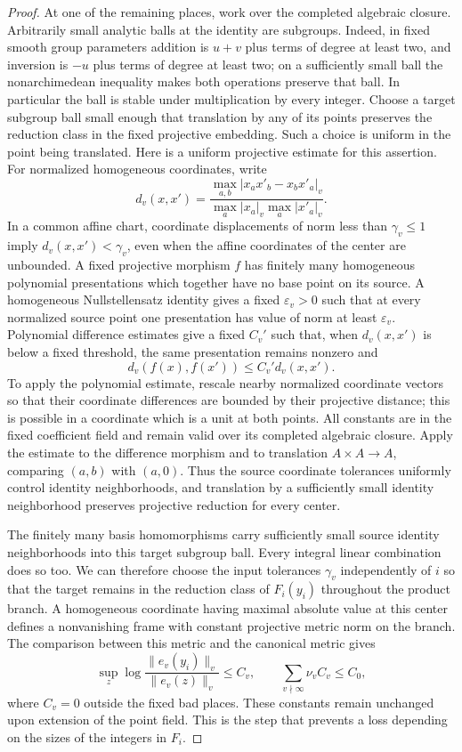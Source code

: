 \begin{proof}
At one of the remaining places, work over the completed algebraic
closure.  Arbitrarily small analytic balls at the identity are
subgroups.  Indeed, in fixed smooth group parameters addition is
$u+v$ plus terms of degree at least two, and inversion is $-u$ plus
terms of degree at least two; on a sufficiently small ball the
nonarchimedean inequality makes both operations preserve that ball.
In particular the ball is stable under multiplication by every
integer.  Choose a target subgroup ball small enough that translation
by any of its points preserves the reduction class in the fixed
projective embedding.  Such a choice is uniform in the point being
translated.  Here is a uniform projective estimate for this assertion. For normalized
homogeneous coordinates, write
\[
 d_v(x,x')=\frac{\max_{a,b}|x_ax'_b-x_bx'_a|_v}
                  {\max_a|x_a|_v\max_a|x'_a|_v}.
\]
In a common affine chart, coordinate displacements of norm less than
$\gamma_v\le1$ imply $d_v(x,x')<\gamma_v$, even when the affine
coordinates of the center are unbounded. A fixed projective morphism $f$
has finitely many homogeneous polynomial presentations which together
have no base point on its source. A homogeneous Nullstellensatz
identity gives a fixed $\varepsilon_v>0$ such that at every normalized
source point one presentation has value of norm at least $\varepsilon_v$. Polynomial
difference estimates give a fixed $C_v'$ such that, when
$d_v(x,x')$ is below a fixed threshold, the same presentation remains
nonzero and
\[
 d_v(f(x),f(x'))\le C_v' d_v(x,x').
\]
To apply the polynomial estimate, rescale nearby normalized coordinate
vectors so that their coordinate differences are bounded by their
projective distance; this is possible in a coordinate which is a unit
at both points. All constants are in the fixed coefficient field and
remain valid over its completed algebraic closure.
Apply the estimate to the difference morphism and to translation
$A\times A\to A$, comparing $(a,b)$ with $(a,0)$. Thus the source
coordinate tolerances uniformly control identity neighborhoods, and
translation by a sufficiently small identity neighborhood preserves
projective reduction for every center.

The finitely many basis homomorphisms carry sufficiently small source
identity neighborhoods into this target subgroup ball.  Every integral
linear combination does so too.  We can therefore choose the input
tolerances $\gamma_v$ independently of $i$ so that the target remains
in the reduction class of $F_i(y_i)$ throughout the product branch.
A homogeneous coordinate having maximal absolute value at this center
defines a nonvanishing frame with constant projective metric norm on
the branch.  The comparison between this metric and the canonical
metric gives
\begin{equation}\label{eq:index-finite-metric}
 \sup_z\log\frac{\|e_v(y_i)\|_v}{\|e_v(z)\|_v}\le C_v,
 \qquad \sum_{v\nmid\infty}\nu_v C_v\le C_0,
\end{equation}
where $C_v=0$ outside the fixed bad places.  These constants remain
unchanged upon extension of the point field.  This is the step that
prevents a loss depending on the sizes of the integers in $F_i$.


\end{proof}
